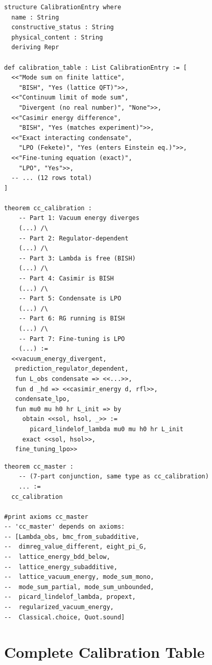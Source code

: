 \documentclass[11pt,a4paper]{article}
\theoremstyle{plain}
\theoremstyle{definition}
\begin{document}
\begin{lstlisting}[caption={Assembly: \texttt{CalibrationTable.lean} (excerpt)}]
structure CalibrationEntry where
  name : String
  constructive_status : String
  physical_content : String
  deriving Repr

def calibration_table : List CalibrationEntry := [
  <<"Mode sum on finite lattice",
    "BISH", "Yes (lattice QFT)">>,
  <<"Continuum limit of mode sum",
    "Divergent (no real number)", "None">>,
  <<"Casimir energy difference",
    "BISH", "Yes (matches experiment)">>,
  <<"Exact interacting condensate",
    "LPO (Fekete)", "Yes (enters Einstein eq.)">>,
  <<"Fine-tuning equation (exact)",
    "LPO", "Yes">>,
  -- ... (12 rows total)
]

theorem cc_calibration :
    -- Part 1: Vacuum energy diverges
    (...) /\
    -- Part 2: Regulator-dependent
    (...) /\
    -- Part 3: Lambda is free (BISH)
    (...) /\
    -- Part 4: Casimir is BISH
    (...) /\
    -- Part 5: Condensate is LPO
    (...) /\
    -- Part 6: RG running is BISH
    (...) /\
    -- Part 7: Fine-tuning is LPO
    (...) :=
  <<vacuum_energy_divergent,
   prediction_regulator_dependent,
   fun L_obs condensate => <<...>>,
   fun d _hd => <<casimir_energy d, rfl>>,
   condensate_lpo,
   fun mu0 mu h0 hr L_init => by
     obtain <<sol, hsol, _>> :=
       picard_lindelof_lambda mu0 mu h0 hr L_init
     exact <<sol, hsol>>,
   fine_tuning_lpo>>
\end{lstlisting}

\begin{lstlisting}[caption={Master theorem and axiom audit: \texttt{Main.lean}}]
theorem cc_master :
    -- (7-part conjunction, same type as cc_calibration)
    ... :=
  cc_calibration

#print axioms cc_master
-- 'cc_master' depends on axioms:
-- [Lambda_obs, bmc_from_subadditive,
--  dimreg_value_different, eight_pi_G,
--  lattice_energy_bdd_below,
--  lattice_energy_subadditive,
--  lattice_vacuum_energy, mode_sum_mono,
--  mode_sum_partial, mode_sum_unbounded,
--  picard_lindelof_lambda, propext,
--  regularized_vacuum_energy,
--  Classical.choice, Quot.sound]
\end{lstlisting}

\section{Complete Calibration Table}\label{sec:table}
\end{document}
